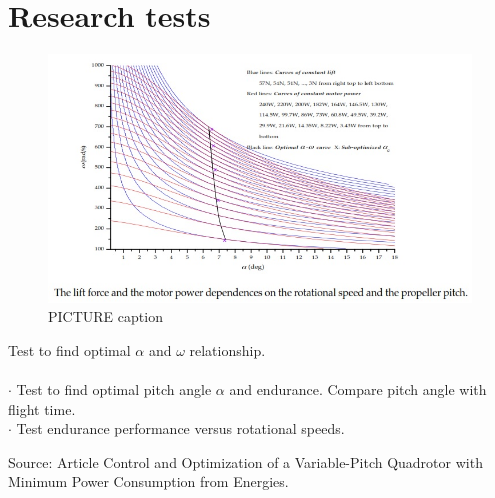 \section{Research tests}
\begin{figure}[H]
    \centering
    \includegraphics[width = 1\textwidth]{VAPIQ-PICTURES/pitchAngleRadSTest.jpg}
    \caption{PICTURE caption}
    \label{fig:testpic1}
\end{figure}

Test to find optimal $\alpha$ and $\omega$ relationship. 
\\ \\
$\cdot$ Test to find optimal pitch angle $\alpha$ and endurance. Compare pitch angle with flight time.\\
$\cdot$  Test endurance performance versus rotational speeds. 




Source: Article Control and Optimization of a Variable-Pitch Quadrotor with Minimum Power Consumption from Energies.